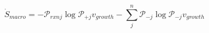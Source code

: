 \begin{equation}
\dot S_{macro} = -\mathcal P_{rxnj}\log\mathcal P_{+j}v_{growth} -\sum_j^n\mathcal P_{-j}\log\mathcal P_{-j} v_{growth}
\end{equation}